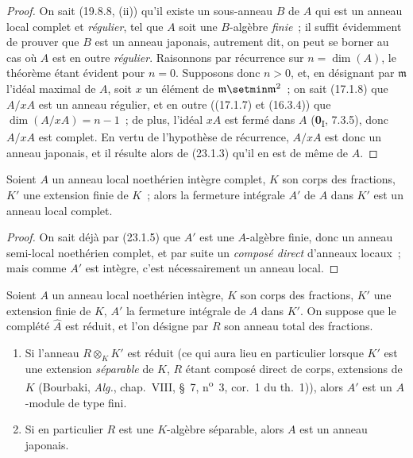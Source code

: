 \begin{proof}
On sait (19.8.8, (ii)) qu'il existe un sous-anneau $B$ de $A$ qui est un
anneau local complet et \emph{régulier}, tel que $A$ soit une $B$-algèbre \emph{finie}~; il
suffit évidemment de prouver
que $B$ est un anneau japonais, autrement dit, on peut se borner au cas où
$A$ est en outre \emph{régulier}. Raisonnons par récurrence sur
$n=\dim(A)$, le théorème étant évident pour $n=0$. Supposons donc $n>0$, et,
en désignant par $\mathfrak m$ l'idéal maximal de $A$, soit $x$ un élément de
$\mathfrak m\setmin\mathfrak m^2$~; on sait (17.1.8) que $A/xA$ est un anneau
régulier, et en outre ((17.1.7) et (16.3.4)) que
$\dim(A/xA)=n-1$~; de plus, l'idéal $xA$ est fermé dans $A$
(\textbf{0}\textsubscript{I}, 7.3.5), donc $A/xA$ est complet. En vertu de l'hypothèse
de récurrence, $A/xA$ est donc un anneau japonais, et il résulte alors de
(23.1.3) qu'il en est de même de $A$.
\end{proof}

\begin{corollary}[23.1.6]
\label{0.23.1.6-fr}
Soient $A$ un anneau local noethérien intègre complet, $K$ son corps des
fractions, $K'$ une extension finie de $K$~; alors la fermeture intégrale
$A'$ de $A$ dans $K'$ est un anneau local complet.
\end{corollary}

\begin{proof}
On sait déjà par (23.1.5) que $A'$ est une $A$-algèbre finie, donc un anneau
semi-local noethérien complet, et par suite un \emph{composé direct}
d'anneaux locaux~; mais comme $A'$ est intègre, c'est nécessairement un
anneau local.
\end{proof}

\begin{proposition}[23.1.7]
\label{0.23.1.7-fr}
Soient $A$ un anneau local noethérien intègre, $K$ son corps des fractions,
$K'$ une extension finie de $K$, $A'$ la fermeture intégrale de $A$ dans
$K'$. On suppose que le complété $\widehat A$ est \textup{réduit}, et l'on désigne par
$R$ son anneau total des fractions.
\begin{enumerate}
  \item[\textup{(i)}] Si l'anneau $R\otimes_KK'$ est réduit \textup{(ce qui aura lieu en
  particulier lorsque $K'$ est une extension \emph{séparable} de $K$, $R$ étant
  composé direct de corps, extensions de $K$ (Bourbaki, \emph{Alg.},
  chap.~VIII, §~7, n\textsuperscript{o}~3, cor.~1 du th.~1))}, alors $A'$ est
  un $A$-module de type fini.
  \item[\textup{(ii)}] Si en particulier $R$ est une $K$-algèbre séparable, alors $A$
  est un anneau japonais.
\end{enumerate}
\end{proposition}

